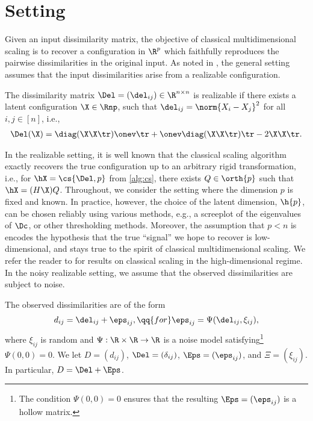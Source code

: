 \documentclass[10pt]{article}
\begin{document}
\section{{Setting}}\label{sec:background}

Given an input dissimilarity matrix, the objective of classical multidimensional scaling is to recover a configuration in $\R^p$ which faithfully reproduces the pairwise dissimilarities in the original input. As noted in , the general setting assumes that the input dissimilarities arise from a realizable configuration.
\begin{definition}
    The dissimilarity matrix $\Del = (\del_{ij}) \in \R^{n \times n}$ is realizable if there exists a latent configuration $\X \in \Rnp$, such that $\del_{ij} = \norm{X_i - X_j}^2$ for all $i, j \in [n]$, i.e., 
    \begin{align}
    \Del(\X) = \diag(\X\X\tr)\onev\tr + \onev \diag(\X\X\tr)\tr - 2\X\X\tr.\label{eq:Del-matrix-form}
\end{align}
\end{definition}
In the realizable setting, it is well known that the classical scaling algorithm exactly recovers the true configuration up to an arbitrary rigid transformation, i.e., for $\hX = \cs{\Del, p}$ from \cref{alg:cs}, there exists $Q \in \orth{p}$ such that $\hX = (H\X) Q$. Throughout, we consider the setting where the dimension $p$ is fixed and known. In practice, however, the choice of the latent dimension, $\h{p}$, can be chosen reliably using various methods, e.g., a screeplot of the eigenvalues of $\Dc$, or other thresholding methods. Moreover, the assumption that $p < n$ is encodes the hypothesis that the true ``signal'' we hope to recover is low-dimensional, and stays true to the spirit of classical multidimensional scaling. We refer the reader to \cite{peterfreund2021multidimensional} for results on classical scaling in the high-dimensional regime. In the noisy realizable setting, we assume that the observed dissimilarities are subject to noise.

\begin{definition}\label{noisy-setting}
    The observed dissimilarities are of the form 
    \begin{align}
        d_{ij} = \del_{ij} + \eps_{ij}, \qq{for } \eps_{ij} = \Psi(\del_{ij}, \xi_{ij}),
    \end{align}
    where $\xi_{ij}$ is random and $\Psi: \R \times \R \to \R$ is a noise model satisfying\footnote{The condition $\Psi(0, 0) = 0$ ensures that the resulting $\Eps = (\eps_{ij})$ is a hollow matrix.} $\Psi(0, 0) = 0$. We let $D = (d_{ij})$, $\Del = (\delta_{ij})$, $\Eps = (\eps_{ij})$, and $\Xi = (\xi_{ij})$. In particular, $D = \Del + \Eps$.
\end{definition}
\end{document}
